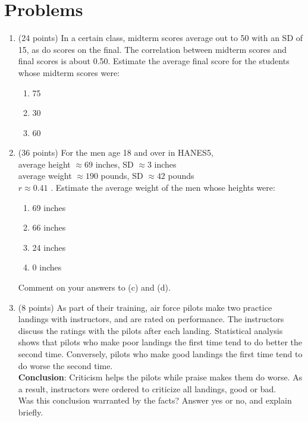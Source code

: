 \documentclass[12pt, oneside]{article}
\begin{document}
\section{Problems}
\begin{enumerate}

\item (24 points) In a certain class, midterm scores average out to 50 with an SD of 15, as do scores on the final. The correlation between midterm scores and final scores is about 0.50. Estimate the average final score for the students whose midterm scores were:
\begin{enumerate}
    \item 75
    \item 30
    \item 60
\end{enumerate}
    

\newpage
\item (36 points) For the men age 18 and over in HANES5,
\\average height $\approx 69$ inches,      SD $\approx 3$ inches
\\average weight $\approx 190$ pounds,     SD $\approx 42$ pounds
\\$r \approx 0.41$ .
Estimate the average weight of the men whose heights were:
\begin{enumerate}
    \item 69 inches
    \item 66 inches
    \item 24 inches
    \item 0 inches
\end{enumerate}
Comment on your answers to (c) and (d).


\newpage
\item (8 points) As part of their training, air force pilots make two practice landings with instructors, and are rated on performance. The instructors discuss the ratings with the pilots after each landing. Statistical analysis shows that pilots who make poor landings the first time tend to do better the second time. Conversely, pilots who make good landings the first time tend to do worse the second time. 
\\\textbf{Conclusion}: Criticism helps the pilots while praise makes them do worse. As a result, instructors were ordered to criticize all landings, good or bad. 
\\Was this conclusion warranted by the facts? Answer yes or no, and explain briefly.



\end{enumerate}
\end{document}
